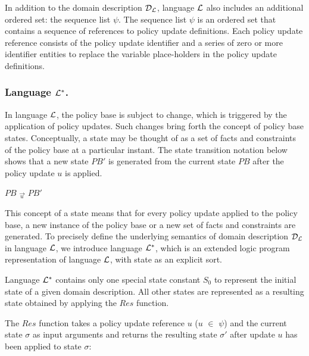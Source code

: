 \documentclass[global,twocolumn,final]{svjour}
\newenvironment{vquote}
  {\begin{list}{}{\leftmargin 1em}\item[]}
  {\end{list}}
\begin{document}
        In addition to the domain description ${\cal D}_{\cal L}$, language
        ${\cal L}$ also includes an additional ordered set: the sequence list
        $\psi$. The sequence list $\psi$ is an ordered set that contains a
        sequence of references to policy update definitions. Each policy update
        reference consists of the policy update identifier and a series of zero
        or more identifier entities to replace the variable place-holders in
        the policy update definitions.

      \subsubsection{Language ${\cal L}^{*}$.}

        In language ${\cal L}$, the policy base is subject to change, which is
        triggered by the application of policy updates. Such changes bring
        forth the concept of policy base states. Conceptually, a state may be
        thought of as a set of facts and constraints of the policy base at a
        particular instant. The state transition notation below shows that a
        new state $PB'$ is generated from the current state $PB$ after the
        policy update $u$ is applied.

        \begin{vquote}
          $PB$ $\overrightarrow{_{u}}$ $PB'$
        \end{vquote}

        This concept of a state means that for every policy update applied
        to the policy base, a new instance of the policy base or a new set of
        facts and constraints are generated. To precisely define the underlying
        semantics of domain description ${\cal D}_{\cal L}$ in language
        ${\cal L}$, we introduce language ${\cal L}^{*}$, which is an extended
        logic program representation of language ${\cal L}$, with state as an
        explicit sort.

        Language ${\cal L}^{*}$ contains only one special state constant
        $S_{0}$ to represent the initial state of a given domain description.
        All other states are represented as a resulting state obtained by
        applying the $Res$ function.

        The $Res$ function takes a policy update reference $u$ ($u$ $\in$
        $\psi$) and the current state $\sigma$ as input arguments and
        returns the resulting state $\sigma'$ after update $u$ has been applied
        to state $\sigma$:
\end{document}
